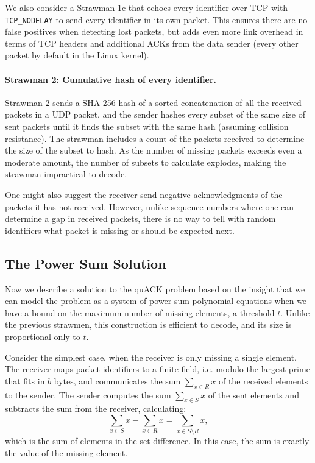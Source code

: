 We also consider a Strawman 1c that echoes every identifier over TCP with
\texttt{TCP\_NODELAY} to send every identifier in its own packet.
This ensures there are no false positives when detecting lost packets,
but adds even more link overhead in terms of TCP headers and additional ACKs
from the data sender (every other packet by default in the Linux kernel).

\paragraph{Strawman 2: Cumulative hash of every identifier.}
Strawman 2 sends a SHA-256 hash of a sorted concatenation of all the
received packets in a UDP packet, and the sender hashes every subset of the same size of
sent packets until it finds the subset with the same hash (assuming collision resistance).
The strawman includes
a count of the packets received to determine the size of the subset to hash.
As the number of missing packets exceeds even a moderate amount, the number
of subsets to calculate explodes, making the strawman impractical to decode.

\smallskip

One might also suggest the receiver send negative acknowledgments of the packets
it has not received. However, unlike sequence numbers where one can
determine a gap in received packets, there is no way to tell with random
identifiers what packet is missing or should be expected next.

\subsection{The Power Sum Solution}

% 
Now we describe a solution to the quACK problem based on the insight
that we can model the problem as a system of power sum polynomial equations
when we have a bound on the maximum number of missing elements, a threshold $t$.
Unlike the previous strawmen, this construction is efficient to decode, and
its size is proportional only to $t$.

Consider the simplest case, when the receiver is only missing a single element.
The receiver maps packet identifiers to a finite field,
i.e. modulo the largest prime that fits in $b$ bytes,
 and communicates the sum $\sum_{x \in R} x$ of the received
elements to
the sender. The sender computes the sum $\sum_{x \in S} x$ of the sent elements
and subtracts the sum from the receiver, calculating:
\[
    \sum_{x \in S} x - \sum_{x \in R} x = \sum_{x \in S\setminus R} x,
\]
which is the sum of elements in the set difference. In this case, the sum is
exactly the value of the missing element.

